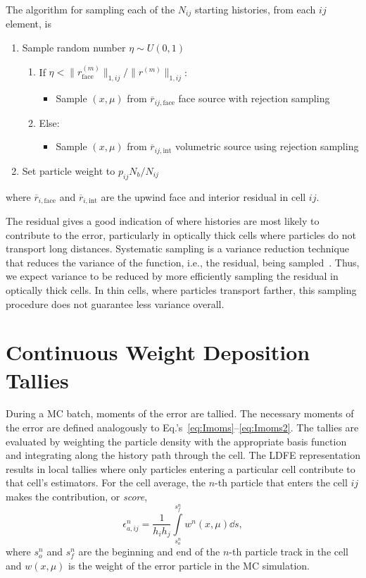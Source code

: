 The algorithm for sampling each of the $N_{ij}$ starting histories, from each $ij$ element, is
\begin{enumerate}
    \item Sample random number $\eta\sim U(0,1)$ 
    \begin{enumerate}
        \item If $\eta < \|r^{(m)}_{\text{face}}\|_{1,ij}/\|r^{(m)}\|_{1,ij}$:
            \begin{itemize}
                \item Sample $(x,\mu)$ from $\overline r_{ij,\text{face}}$ face source with
                    rejection sampling
            \end{itemize}
        \item Else:
            \begin{itemize}
                \item Sample $(x,\mu)$ from $\overline r_{ij,\text{int}}$ volumetric source
                    using rejection sampling
            \end{itemize}
    \end{enumerate}
\item Set particle weight to $p_{ij}N_b/N_{ij}$
\end{enumerate}
where $\overline r_{i,\text{face}}$ and $\overline r_{i,\text{int}}$ are the upwind face and
interior residual in cell $ij$.

The residual gives a good indication of where
histories are most likely to contribute to the error, particularly in optically
thick cells where particles do not transport long distances. Systematic sampling is a
variance reduction technique that reduces the variance of the function, i.e., the residual, being sampled~\cite{shultis_mc}.  Thus, we expect
variance to be reduced by more efficiently sampling the residual in optically thick cells.  In thin
cells, where particles transport farther, this sampling procedure does not guarantee less variance
overall. 


\section{Continuous Weight Deposition Tallies}
\label{sec:tallies}

During a MC batch, moments of the error are tallied.  The necessary moments of the error are
defined analogously to Eq.'s~\eqref{eq:Imoms}--\eqref{eq:Imoms2}.  
The tallies are evaluated by weighting the particle density with the appropriate
basis function and integrating along the history path through the cell.  The LDFE
representation results in local tallies where only particles entering a particular cell
contribute to that cell's estimators.  For the cell average, the $n$-th
particle that enters the cell $ij$ makes the contribution, or \emph{score},
\begin{equation}\label{eq:avg_tal}
   \epsilon^n_{a,ij} = \frac{1}{h_ih_j} \int\limits_{s^n_o}^{s^n_f}  w^n(x,\mu) \dd s,
\end{equation}
where $s_o^n$ and $s_f^n$ are the beginning and end of the $n$-th particle track in the cell and $w(x,\mu)$ is
the weight of the error particle in the MC simulation. 

